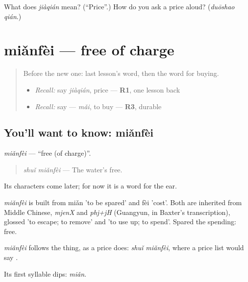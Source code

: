 \begin{tcolorbox}[breakable,colback=teal!4,colframe=teal!35!black,title={Before you move on}]
What does \emph{jiàqián} mean? (\textquotedblleft{}Price\textquotedblright{}.) How do you ask a price aloud? (\emph{duōshao qián}.)
\end{tcolorbox}
\section[miǎnfèi]{miǎnfèi — free of charge}

\label{lesson:ZH-C156-mianfei}



\begin{quote}
Before the new one: last lesson's word, then the word for buying.

\begin{itemize}
\raggedright
  \item \emph{Recall:} say \emph{jiàqián}, price — \textbf{R1}, one lesson back
  \item \emph{Recall:} say  — \emph{mǎi}, to buy — \textbf{R3}, durable
\end{itemize}
\end{quote}

\subsection*{You'll want to know: miǎnfèi}
\emph{miǎnfèi} — \textquotedblleft{}free (of charge)\textquotedblright{}.

\begin{quote}
\emph{shuǐ miǎnfèi} — The water's free.
\end{quote}

Its characters come later; for now it is a word for the ear.

\begin{cousinweb}
\emph{miǎnfèi} is built from miǎn 'to be spared' and fèi 'cost'. Both are inherited from Middle Chinese, \emph{mjenX} and \emph{phj+jH} (Guangyun, in Baxter's transcription), glossed 'to escape; to remove' and 'to use up; to spend'. Spared the spending: free.
\end{cousinweb}

\begin{grammarlens}[title={What you've built}]
\emph{miǎnfèi} follows the thing, as a price does: \emph{shuǐ miǎnfèi}, where a price list would say  .

Its first syllable dips: \emph{miǎn}.
\end{grammarlens}

